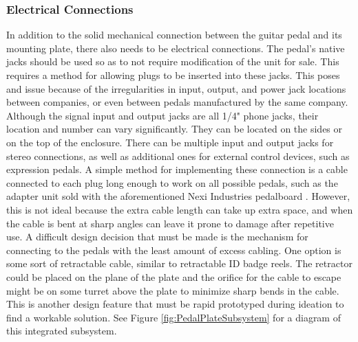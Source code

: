 \documentclass{article}
\begin{document}
		\subsubsection{Electrical Connections}
		In addition to the solid mechanical connection between the guitar pedal and its mounting plate, there also needs to be electrical connections.  The pedal's native jacks should be used so as to not require modification of the unit for sale.  This requires a method for allowing plugs to be inserted into these jacks.  This poses and issue because of the irregularities in input, output, and power jack locations between companies, or even between pedals manufactured by the same company.  Although the signal input and output jacks are all 1/4" phone jacks, their location and number can vary significantly.  They can be located on the sides or on the top of the enclosure.  There can be multiple input and output jacks for stereo connections, as well as additional ones for external control devices, such as expression pedals.  A simple method for implementing these connection is a cable connected to each plug long enough to work on all possible pedals, such as the adapter unit sold with the aforementioned Nexi Industries pedalboard \cite{conNEXI}.  However, this is not ideal because the extra cable length can take up extra space, and when the cable is bent at sharp angles can leave it prone to damage after repetitive use.  A difficult design decision that must be made is the mechanism for connecting to the pedals with the least amount of excess cabling.  One option is some sort of retractable cable, similar to retractable ID badge reels.  The retractor could be placed on the plane of the plate and the orifice for the cable to escape might be on some turret above the plate to minimize sharp bends in the cable.  This is another design feature that must be rapid prototyped during ideation to find a workable solution.  See Figure \ref{fig:PedalPlateSubsystem} for a diagram of this integrated subsystem.
\end{document}
